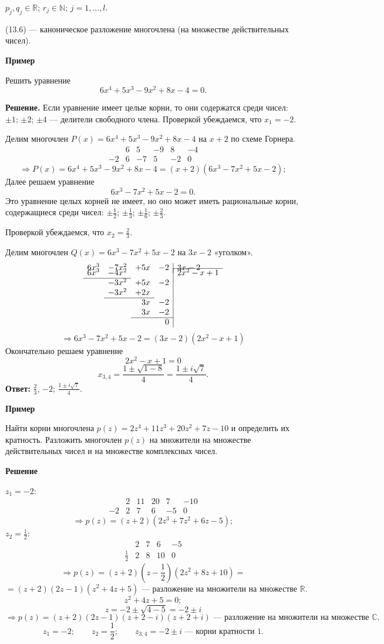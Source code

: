 \documentclass[12pt,a4paper]{article}
\begin{document}
$p_j,q_j\in\mathbb R$; $r_j\in\mathbb N$; $j=1,\ldots,l$.

(13.6) --- каноническое разложение многочлена (на множестве
действительных чисел).

\textbf{Пример}

Решить уравнение
$$
6x^4+5x^3-9x^2+8x-4=0.
$$

\textbf{Решение.} Если уравнение имеет целые корни, то они содержатся
среди чисел: $\pm1$; $\pm2$; $\pm4$ --- делители свободного члена.
Проверкой убеждаемся, что $x_1=-2$.

Делим многочлен $P(x)=6x^4+5x^3-9x^2+8x-4$ на $x+2$ по схеме Горнера.
$$
\begin{array}{c|ccccc}
&6&5&-9&8&-4\\
-2&6&-7&5&-2&0
\end{array}
$$
$$
\Rightarrow P(x)=6x^4+5x^3-9x^2+8x-4=(x+2)(6x^3-7x^2+5x-2);
$$
Далее решаем уравнение
$$
6x^3-7x^2+5x-2=0.
$$
Это уравнение целых корней не имеет, но оно может иметь рациональные
корни, содержащиеся среди чисел: $\pm\frac12$; $\pm\frac13$;
$\pm\frac16$; $\pm\frac23$.

Проверкой убеждаемся, что $x_2=\frac23$.

Делим многочлен $Q(x)=6x^3-7x^2+5x-2$ на $3x-2$ «уголком».
$$
\begin{array}{rrrr|l}
6x^3&-7x^2&+5x&-2&3x-2\\[-2mm]
\cline{5-5}
6x^3&-4x^2&&&2x^2-x+1\\
\cline{1-2}
&-3x^2&+5x&-2&\\
&-3x^2&+2x&&\\
\cline{2-3}
&&3x&-2&\\
&&3x&-2&\\
\cline{3-4}
&&&0&
\end{array}
$$
$$
\Rightarrow 6x^3-7x^2+5x-2=(3x-2)(2x^2-x+1)
$$
Окончательно решаем уравнение
$$
2x^2-x+1=0
$$
$$
x_{3,4}=\frac{1\pm\sqrt{1-8}}{4}=\frac{1\pm i\sqrt7}{4}.
$$
\textbf{Ответ:} $\frac23$, $-2$; $\frac{1\pm i\sqrt7}{4}$.

\textbf{Пример}

Найти корни многочлена $p(z)=2z^4+11z^3+20z^2+7z-10$ и определить их
кратность. Разложить многочлен $p(z)$ на множители на множестве
действительных чисел и на множестве комплексных чисел.

\textbf{Решение}

$z_1=-2$:
$$
\begin{array}{c|ccccc}
&2&11&20&7&-10\\
-2&2&7&6&-5&0
\end{array}
$$
$$
\Rightarrow p(z)=(z+2)(2z^3+7z^2+6z-5);
$$
$z_2=\frac12$:
$$
\begin{array}{c|cccc}
&2&7&6&-5\\
\frac12&2&8&10&0
\end{array}
$$
$$
\Rightarrow p(z)=(z+2)\left(z-\frac12\right)(2z^2+8z+10)=
$$
$$
=(z+2)(2z-1)(z^2+4z+5) \text{ --- разложение на множители на
множестве } \mathbb R.
$$
$$
z^2+4z+5=0;
$$
$$
z=-2\pm\sqrt{4-5}=-2\pm i
$$
$$
\Rightarrow p(z)=(z+2)(2z-1)(z+2-i)(z+2+i) \text{ --- разложение на
множители на множестве } \mathbb C.
$$
$$
z_1=-2;\qquad z_2=\frac12;\qquad z_{3,4}=-2\pm i \text{ --- корни кратности } 1.
$$
\end{document}
